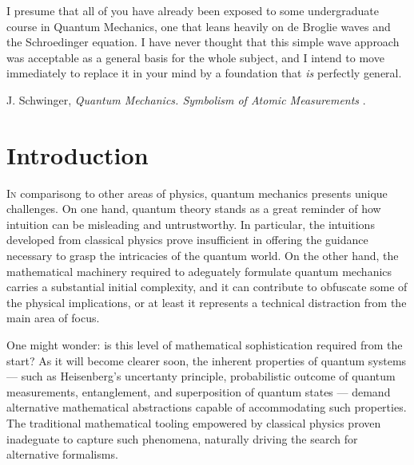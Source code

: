 


\label{chp:fundamentals} 


\begin{refsection}
\begin{quoting}
   \openquote 
   I presume that all of you have already been exposed to some undergraduate
   course in Quantum Mechanics, one that leans heavily on de Broglie waves and
   the Schroedinger equation. I have never thought that this simple wave
   approach was acceptable as a general basis for the whole subject, and I
   intend to move immediately to replace it in your mind by a foundation that
   \emph{is} perfectly general.~\closequote
   \begin{flushright}
       J. Schwinger,
       \emph{Quantum Mechanics. Symbolism of Atomic Measurements}
       \textcite{Schwinger:2001}.
    \end{flushright}
\end{quoting}

\section{Introduction}

\lettrine{I}{n} 
comparisong to other areas of physics, quantum mechanics presents unique challenges.
On one hand, quantum theory stands as a great reminder of how intuition can be misleading and untrustworthy.
 In particular, the intuitions developed from classical physics prove insufficient in offering the guidance necessary to grasp the intricacies of the quantum world.
  On the other hand, the mathematical machinery required to adeguately formulate quantum mechanics carries a substantial initial complexity, and it can contribute to obfuscate some of the physical implications, or at least it represents a technical distraction from the main area of focus. 

  One might wonder: is this level of mathematical sophistication required from the start?
  As it will become clearer soon, the inherent properties of quantum systems --- 
  such as Heisenberg's uncertanty principle, probabilistic outcome of 
 quantum measurements, entanglement, and superposition of quantum
  states --- demand alternative mathematical abstractions capable of accommodating 
such properties.  The traditional mathematical tooling empowered by classical physics 
  proven inadeguate to 
capture such phenomena, naturally driving the search for alternative formalisms.


\end{refsection}
